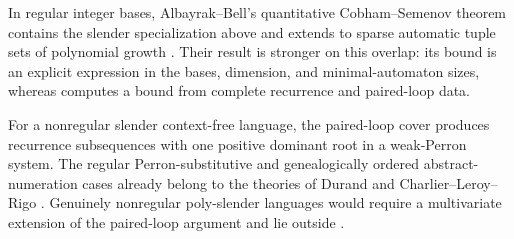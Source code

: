 \begin{remark}
  \label{rem:slender-cobham-priority}
  In regular integer bases, Albayrak--Bell's quantitative Cobham--Semenov
  theorem contains the slender specialization above and extends to sparse
  automatic tuple sets of polynomial growth
  \cite[Theorems~1.1 and 4.1]{AlbayrakBell2023}. Their result is stronger on
  this overlap: its bound is an explicit expression in the bases, dimension,
  and minimal-automaton sizes, whereas 
  computes a bound from complete recurrence and paired-loop data.

  For a nonregular slender context-free language, the paired-loop cover
  produces recurrence subsequences with one positive dominant root in a
  weak-Perron system. The regular
  Perron-substitutive and genealogically ordered abstract-numeration cases
  already belong to the theories of Durand and Charlier--Leroy--Rigo
  \cite[Theorem~1]{Durand2011CobhamSubstitutions}%
  \cite[Theorem~49]{CharlierLeroyRigo2013CobhamANS}. Genuinely nonregular
  poly-slender languages would require a multivariate extension of the
  paired-loop argument and lie outside .
\end{remark}
